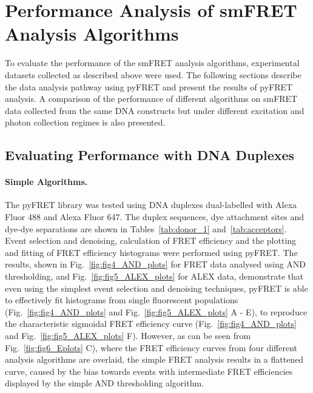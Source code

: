 \section{Performance Analysis of smFRET Analysis Algorithms}
\label{sect:performance_analysis}
To evaluate the performance of the smFRET analysis algorithms, experimental datasets collected as described above were used. The following sections describe the data analysis pathway using pyFRET and present the results of pyFRET analysis. A comparison of the performance of different algorithms on smFRET data collected from the same DNA constructs but under different excitation and photon collection regimes is also presented.

\subsection{Evaluating Performance with DNA Duplexes}
\paragraph{Simple Algorithms.}
The pyFRET library was tested using DNA duplexes dual-labelled with Alexa Fluor 488 and Alexa Fluor 647. The duplex sequences, dye attachment sites and dye-dye separations are shown in Tables~\ref{tab:donor_1} and~\ref{tab:acceptors}. Event selection and denoising, calculation of FRET efficiency and the plotting and fitting of FRET efficiency histograms were performed using pyFRET. The results, shown in Fig.~\ref{fig:fig4_AND_plots} for FRET data analysed using AND thresholding, and Fig.~\ref{fig:fig5_ALEX_plots} for ALEX data, demonstrate that even using the simplest event selection and denoising techniques, pyFRET is able to effectively fit histograms from single fluorescent populations (Fig.~\ref{fig:fig4_AND_plots} and Fig.~\ref{fig:fig5_ALEX_plots} A - E), to reproduce the characteristic sigmoidal FRET efficiency curve (Fig.~\ref{fig:fig4_AND_plots} and Fig.~\ref{fig:fig5_ALEX_plots} F). However, as can be seen from Fig.~\ref{fig:fig6_Eplots} C), where the FRET efficiency curves from four different analysis algorithms are overlaid, the simple FRET analysis results in a flattened curve, caused by the bias towards events with intermediate FRET efficiencies displayed by the simple AND thresholding algorithm. 

